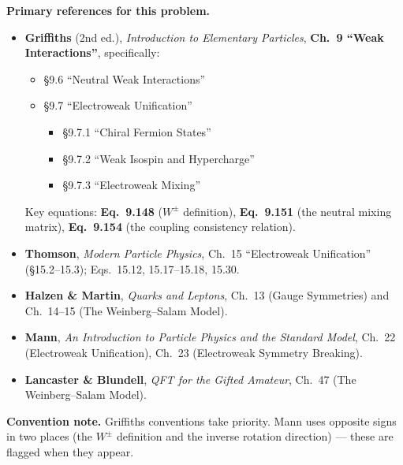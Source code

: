 \documentclass[11pt]{article}
\begin{document}
\begin{contextbox}
\textbf{Primary references for this problem.}
\begin{itemize}[leftmargin=*]
  \item \textbf{Griffiths} (2nd ed.), \emph{Introduction to Elementary Particles},
        \textbf{Ch.~9 ``Weak Interactions''}, specifically:
        \begin{itemize}[leftmargin=*]
          \item §9.6 ``Neutral Weak Interactions''
          \item §9.7 ``Electroweak Unification''
                \begin{itemize}
                  \item §9.7.1 ``Chiral Fermion States''
                  \item §9.7.2 ``Weak Isospin and Hypercharge''
                  \item §9.7.3 ``Electroweak Mixing'' 
                \end{itemize}
        \end{itemize}
        Key equations: \textbf{Eq.~9.148} ($W^\pm$ definition), \textbf{Eq.~9.151} (the neutral mixing matrix),
        \textbf{Eq.~9.154} (the coupling consistency relation).
  \item \textbf{Thomson}, \emph{Modern Particle Physics}, Ch.~15 ``Electroweak Unification''
        (§15.2--15.3); Eqs.~15.12, 15.17--15.18, 15.30.
  \item \textbf{Halzen \& Martin}, \emph{Quarks and Leptons}, Ch.~13 (Gauge Symmetries) and
        Ch.~14--15 (The Weinberg--Salam Model).
  \item \textbf{Mann}, \emph{An Introduction to Particle Physics and the Standard Model},
        Ch.~22 (Electroweak Unification), Ch.~23 (Electroweak Symmetry Breaking).
  \item \textbf{Lancaster \& Blundell}, \emph{QFT for the Gifted Amateur}, Ch.~47
        (The Weinberg--Salam Model).
\end{itemize}
\textbf{Convention note.} Griffiths conventions take priority. Mann uses opposite signs in two
places (the $W^\pm$ definition and the inverse rotation direction) --- these are flagged when
they appear.
\end{contextbox}
\end{document}
